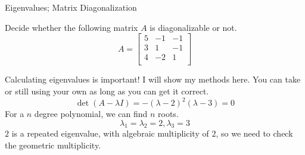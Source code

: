\documentclass{beamer}
\begin{document}
\begin{frame}{Eigenvalues; Matrix Diagonalization}
\begin{example}
    Decide whether the following matrix $A$ is diagonalizable or not.
    \begin{equation*}
        A=\left[ \begin{matrix}
            5&		-1&		-1\\
            3&		1&		-1\\
            4&		-2&		1\\
        \end{matrix} \right]
    \end{equation*}
\end{example}

Calculating eigenvalues is important! I will show my methods here. You can take or still using your own as long as you can get it correct.
\begin{equation*}
    \det \left( A-\lambda I \right) =-\left( \lambda -2 \right) ^2\left( \lambda -3 \right)=0
\end{equation*}
For a $n$ degree polynomial, we can find $n$ roots.
\begin{equation*}
    \lambda _1=\lambda _2=2,\lambda _3=3
\end{equation*}
$2$ is a repeated eigenvalue, with algebraic multiplicity of $2$, so we need to check the geometric multiplicity.
\end{frame}
\end{document}
